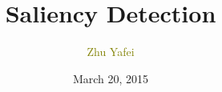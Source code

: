 \documentclass[notheorems,serif,table,compress]{beamer}  %
\begin{document}
\title{Saliency Detection}
\author[]{\textcolor{olive}{Zhu Yafei}}
\date[March 20, 2015]{March 20, 2015}
\frame{ \titlepage }
\def\hilite<#1>{\temporal<#1>{\color{blue!15}}{\color{black}}{\color{black}}}
\newcommand{\shadow}[2][purple]{\hskip5pt\shadowbox{\color{#1}\small \kai #2\vspace{3mm}}}
\newcommand{\colorrbox}[2][purple]{\doublebox{\color{#1}\small \kai#2}}

\end{document}
